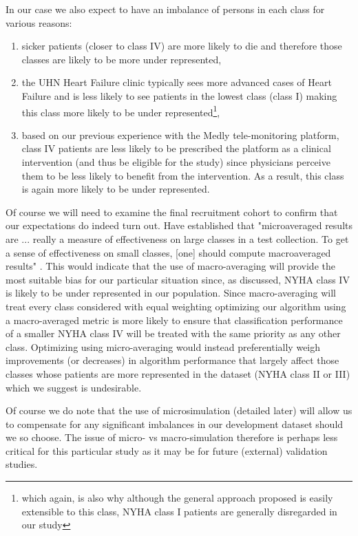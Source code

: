 \documentclass[]{article}
\begin{document}
In our case we also expect to have an imbalance of persons in each class for various reasons: 
\begin{enumerate}[label=\alph*)]
	\item sicker patients (closer to class IV) are more likely to die and therefore those classes are likely to be more under represented,
	\item the UHN Heart Failure clinic typically sees more advanced cases of Heart Failure and is less likely to see patients in the lowest class (class I) making this class more likely to be under represented\footnote{which again, is also why although the general approach proposed is easily extensible to this class, NYHA class I patients are generally disregarded in our study},
	\item based on our previous experience with the Medly tele-monitoring platform, class IV patients are less likely to be prescribed the platform as a clinical intervention (and thus be eligible for the study) since physicians perceive them to be less likely to benefit from the intervention. As a result, this class is again more likely to be under represented.
\end{enumerate}

Of course we will need to examine the final recruitment cohort to confirm that our expectations do indeed turn out. Have established that "microaveraged results are ... really a measure of effectiveness on large classes in a test collection. To get a sense of effectiveness on small classes, [one] should compute macroaveraged results" \cite{Manning2009}. This would indicate that the use of macro-averaging will provide the most suitable bias for our particular situation since, as discussed, NYHA class IV is likely to be under represented in our population. Since macro-averaging will treat every class considered with equal weighting optimizing our algorithm using a macro-averaged metric is more likely to ensure that classification performance of a smaller NYHA class IV will be treated with the same priority as any other class. Optimizing using micro-averaging would instead preferentially weigh improvements (or decreases) in algorithm performance that largely affect those classes whose patients are more represented in the dataset (NYHA class II or III) which we suggest is undesirable.

Of course we do note that the use of microsimulation (detailed later) will allow us to compensate for any significant imbalances in our development dataset should we so choose.  The issue of micro- vs macro-simulation therefore is perhaps less critical for this particular study as it may be for future (external) validation studies.
\end{document}
